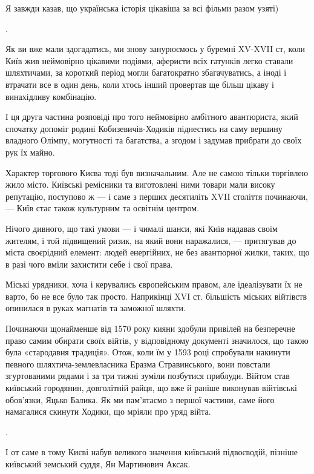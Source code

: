 Я завжди казав, що українська історія цікавіша за всі фільми разом узяті)

.

Як ви вже мали здогадатись, ми знову занурюємось у буремні XV-XVII ст, коли
Київ жив неймовірно цікавими подіями, аферисти всіх гатунків легко ставали
шляхтичами, за короткий період могли багатократно збагачуватись, а іноді і
втрачати все в один день, коли хтось інший провертав ще більш цікаву і
винахідливу комбінацію.


І ця друга частина розповіді про того неймовірно амбітного авантюриста, який
спочатку допоміг родині Кобизевичів-Ходиків піднестись на саму вершину владного
Олімпу, могутності та багатства, а згодом і задумав прибрати до своїх рук їх
майно.

Характер торгового Києва тоді був визначальним. Але не самою тільки торгівлею
жило місто. Київські ремісники та виготовлені ними товари мали високу
репутацію, поступово ж — і саме з перших десятиліть XVII століття починаючи, —
Київ стає також культурним та освітнім центром.


Нічого дивного, що такі умови — і чималі шанси, які Київ надавав своїм жителям,
і той підвищений ризик, на який вони наражалися, — притягував до міста
своєрідний елемент: людей енергійних, не без авантюрної жилки, таких, що в разі
чого вміли захистити себе і свої права. 

Міські урядники, хоча і керувались європейським правом, але ідеалізувати їх не
варто, бо не все було так просто. Наприкінці XVI ст. більшість міських
війтівств опинилася в руках магнатів та заможної шляхти. 

Починаючи щонайменше від 1570 року кияни здобули привілей на безперечне право
самим обирати своїх війтів, у відповідному документі значилося, що такою була
«стародавня традиція». Отож, коли їм у 1593 році спробували накинути певного
шляхтича-землевласника Еразма Стравинського, вони повстали згуртованими рядами
і за три тижні зуміли позбутися приблуди. Війтом став київський городянин,
довголітній райця, що вже й раніше виконував війтівські обов’язки, Яцько
Балика. Як ми пам’ятаємо з першої частини, саме його намагалися скинути Ходики,
що мріяли про уряд війта. 

.

І от саме в тому Києві набув великого значення київський підвоєводій, пізніше
київський земський суддя, Ян Мартинович Аксак. 

